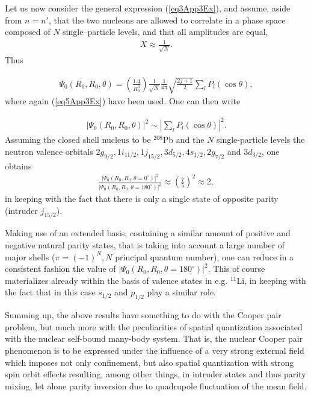 Let us now consider the general expression (\ref{eq3App3Ex}), and assume, aside from $n=n'$, that  the two nucleons are allowed to correlate in a phase space composed of $N$ single--particle levels, and that all amplitudes are equal,
\begin{align}\label{eq8App3E}
X\approx\frac{1}{\sqrt{N}}.
\end{align}
Thus 

\begin{align}\label{eq9App3E}
\Psi_0(R_0,R_0,\theta)
=\left(\frac{1.4}{R_0^3}\right)\frac{1}{\sqrt{N}}\frac{1}{4\pi}\sqrt{\frac{2j+1}{2}}\sum_lP_l(\cos\theta),
\end{align}
where again (\ref{eq5App3Ex}) have been used. One can then  write 

\begin{align}\label{eq10App3E}
|\Psi_0(R_0,R_0,\theta)|^2\sim |\sum_lP_l(\cos\theta)|^2.
\end{align}
Assuming the closed shell nucleus to be $^{208}$Pb and  the $N$ single-particle levels  the neutron valence orbitals $2g_{9/2},1i_{11/2},1j_{15/2},3d_{5/2},4s_{1/2},2g_{7/2}$ and $3d_{3/2}$, one obtains
\begin{align}\label{eq11App3E}
\frac{|\Psi_0(R_0,R_0,\theta=0^\circ)|^2}{|\Psi_0(R_0,R_0,\theta=180^\circ)|^2}\approx\left(\frac{7}{5}\right)^2\approx2,
\end{align}
in keeping with the fact that there is only a single state of opposite parity (intruder $j_{15/2}$).

Making use of an extended basis, containing a similar amount of positive and negative natural parity states, that is taking into account a large number of major shells ($\pi=(-1)^N, N$ principal quantum number), one can reduce in a consistent fashion the value of $|\Psi_0(R_0,R_0,\theta=180^\circ)|^2$.
This of course materializes already within the basis of valence states in e.g. $^{11}$Li, in keeping with the fact that in this case $s_{1/2}$ and $p_{1/2}$ play a similar role. 


Summing up, the above results have something to do with the Cooper pair problem, but much more with the peculiarities of spatial quantization associated with the nuclear self-bound many-body system. That is, the nuclear Cooper pair phenomenon  is to be expressed under the influence of a very strong external field which imposes not only confinement, but also spatial quantization with strong spin orbit effects resulting, among other things, in intruder states and thus parity mixing, let alone parity inversion due to quadrupole fluctuation of the mean field.   


